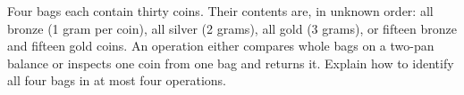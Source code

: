 Four bags each contain thirty coins. Their contents are, in unknown order: all bronze (1 gram per coin), all silver (2 grams), all gold (3 grams), or fifteen bronze and fifteen gold coins. An operation either compares whole bags on a two-pan balance or inspects one coin from one bag and returns it. Explain how to identify all four bags in at most four operations.
